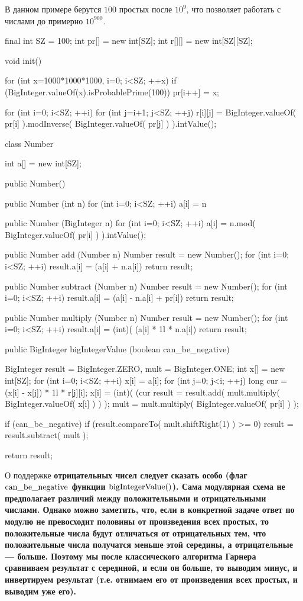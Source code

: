 В данном примере берутся $100$ простых после $10^9$, что позволяет работать с числами до примерно $10^{900}$.

\javacode
final int SZ = 100;
int pr[] = new int[SZ];
int r[][] = new int[SZ][SZ];

void init() {
	for (int x=1000*1000*1000, i=0; i<SZ; ++x)
		if (BigInteger.valueOf(x).isProbablePrime(100))
			pr[i++] = x;
	
	for (int i=0; i<SZ; ++i)
		for (int j=i+1; j<SZ; ++j)
			r[i][j] = BigInteger.valueOf( pr[i] ).modInverse(
					BigInteger.valueOf( pr[j] ) ).intValue();
}


class Number {
	
	int a[] = new int[SZ];
	
	public Number() {
	}
	
	public Number (int n) {
		for (int i=0; i<SZ; ++i)
			a[i] = n %
	}
	
	public Number (BigInteger n) {
		for (int i=0; i<SZ; ++i)
			a[i] = n.mod( BigInteger.valueOf( pr[i] ) ).intValue();
	}
	
	public Number add (Number n) {
		Number result = new Number();
		for (int i=0; i<SZ; ++i)
			result.a[i] = (a[i] + n.a[i]) %
		return result;
	}
	
	public Number subtract (Number n) {
		Number result = new Number();
		for (int i=0; i<SZ; ++i)
			result.a[i] = (a[i] - n.a[i] + pr[i]) %
		return result;
	}
	
	public Number multiply (Number n) {
		Number result = new Number();
		for (int i=0; i<SZ; ++i)
			result.a[i] = (int)( (a[i] * 1l * n.a[i]) %
		return result;
	}
	
	public BigInteger bigIntegerValue (boolean can_be_negative) {
		BigInteger result = BigInteger.ZERO,
			mult = BigInteger.ONE;
		int x[] = new int[SZ];
		for (int i=0; i<SZ; ++i) {
			x[i] = a[i];
			for (int j=0; j<i; ++j) {
				long cur = (x[i] - x[j]) * 1l * r[j][i];
				x[i] = (int)( (cur %
			}
			result = result.add( mult.multiply( BigInteger.valueOf( x[i] ) ) );
			mult = mult.multiply( BigInteger.valueOf( pr[i] ) );
		}
		
		if (can_be_negative)
			if (result.compareTo( mult.shiftRight(1) ) >= 0)
				result = result.subtract( mult );
			
		return result;
	}
}
\endcode

О поддержке \bf{отрицательных} чисел следует сказать особо (флаг $\rm can\_be\_negative$ функции ${\rm bigIntegerValue}()$). Сама модулярная схема не предполагает различий между положительными и отрицательными числами. Однако можно заметить, что, если в конкретной задаче ответ по модулю не превосходит половины от произведения всех простых, то положительные числа будут отличаться от отрицательных тем, что положительные числа получатся меньше этой середины, а отрицательные --- больше. Поэтому мы после классического алгоритма Гарнера сравниваем результат с серединой, и если он больше, то выводим минус, и инвертируем результат (т.е. отнимаем его от произведения всех простых, и выводим уже его).
